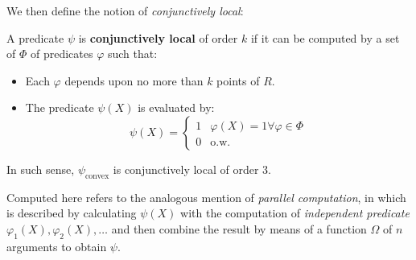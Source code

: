 We then define the notion of \textit{conjunctively local}:
\begin{definition}
    A predicate $\psi$ is \textbf{conjunctively local} of order $k$ if it can be computed by a set of $\Phi$ of predicates $\varphi$ such that: 
    \begin{itemize}
        \item Each $\varphi$ depends upon no more than $k$ points of $R$. 
        \item The predicate $\psi(X)$ is evaluated by: \begin{equation}
            \psi(X) = \begin{cases}
                1 & \varphi(X) = 1\forall \varphi \in \Phi \\
                0 & \text{o.w.}
            \end{cases}
        \end{equation}
    \end{itemize}
    In such sense, $\psi_{\text{convex}}$ is conjunctively local of order 3.
\end{definition}

Computed here refers to the analogous mention of \textit{parallel computation}, in which is described by calculating $\psi(X)$ with the computation of \textit{independent predicate} $\varphi_{1}(X),\varphi_{2}(X),\dots$ and then combine the result by means of a function $\Omega$ of $n$ arguments to obtain $\psi$. 

